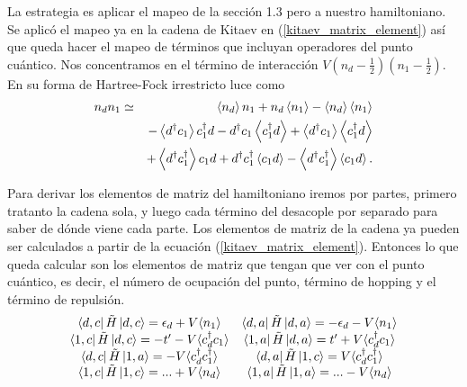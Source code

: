 La estrategia es aplicar el mapeo de la secci\'{o}n 1.3  pero a nuestro hamiltoniano. Se aplic\'{o} el mapeo ya en la cadena de Kitaev en (\ref{kitaev_matrix_element}) así que queda hacer el mapeo de términos que incluyan operadores del punto cuántico. Nos concentramos en el término de interacción $V(n_d-\frac{1}{2})(n_1-\frac{1}{2})$. En su forma de Hartree-Fock irrestricto luce como 
\begin{eqnarray}
n_{d}n_{1} &\simeq &\left\langle n_{d}\right\rangle n_{1}+n_{d}\left\langle
n_{1}\right\rangle -\left\langle n_{d}\right\rangle \left\langle
n_{1}\right\rangle   \notag \\
&&-\left\langle d^{\dagger }c_{1}\right\rangle c_{1}^{\dagger }d-d^{\dagger
}c_{1}\left\langle c_{1}^{\dagger }d\right\rangle +\left\langle d^{\dagger
}c_{1}\right\rangle \left\langle c_{1}^{\dagger }d\right\rangle   \notag \\
&&+\left\langle d^{\dagger }c_{1}^{\dagger }\right\rangle c_{1}d+d^{\dagger
}c_{1}^{\dagger }\left\langle c_{1}d\right\rangle -\left\langle d^{\dagger
}c_{1}^{\dagger }\right\rangle \left\langle c_{1}d\right\rangle .  \label{hf}
\end{eqnarray}
\par Para derivar los elementos de matriz del hamiltoniano iremos por partes, primero tratanto la cadena sola, y luego cada t\'{e}rmino del desacople por separado para saber de d\'{o}nde viene cada parte. Los elementos de matriz de la cadena ya pueden ser calculados a partir de la ecuaci\'{o}n (\ref{kitaev_matrix_element}). Entonces lo que queda calcular son los elementos de matriz que tengan que ver con el punto cu\'{a}ntico, es decir, el n\'{u}mero de ocupaci\'{o}n del punto, t\'{e}rmino de hopping y el t\'{e}rmino de repulsi\'{o}n.  
\begin{equation}
    \begin{matrix}
    \bra{d,c}\tilde H\ket{d,c}= \epsilon_d + V\langle n_1\rangle & \bra{d,a}\tilde H\ket{d,a}= -\epsilon_d - V\langle n_1\rangle\\
     \bra{1,c}\tilde H\ket{d,c} = -t' - V\langle c^\dagger_d c_1\rangle & \bra{1,a}\tilde H\ket{d,a} = t' + V\langle c^\dagger_d c_1\rangle\\
      \bra{d,c}\tilde H\ket{1,a} = -V\langle c^\dagger_d c^\dagger_1 \rangle & \bra{d,a}\tilde H\ket{1,c} = V\langle c^\dagger_d c^\dagger_1 \rangle\\
      \bra{1,c}\tilde H\ket{1,c} = ...+ V\langle n_d\rangle & \bra{1,a}\tilde H\ket{1,a} = ...- V\langle n_d\rangle
    \end{matrix}
\end{equation}
